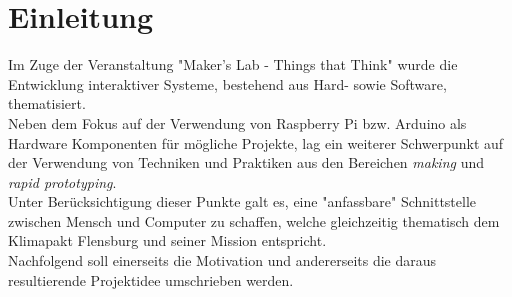 \documentclass[.../Dokumentation.tex]{subfiles}
\begin{document}
\section{Einleitung}\label{sec-intr}
Im Zuge der Veranstaltung "Maker's Lab - Things that Think" wurde die 
Entwicklung interaktiver Systeme, bestehend aus Hard- sowie Software, 
thematisiert.\\
Neben dem Fokus auf der Verwendung von Raspberry Pi bzw. Arduino als Hardware 
Komponenten für mögliche Projekte, lag ein weiterer Schwerpunkt auf der 
Verwendung von Techniken und Praktiken aus den Bereichen \textit{making} und 
\textit{rapid prototyping}.\\
Unter Berücksichtigung dieser Punkte galt es, eine "anfassbare" Schnittstelle 
zwischen Mensch und Computer zu schaffen, welche gleichzeitig thematisch dem 
Klimapakt Flensburg und seiner Mission entspricht.\\
Nachfolgend soll einerseits die Motivation und andererseits die daraus 
resultierende Projektidee umschrieben werden.
\end{document}
